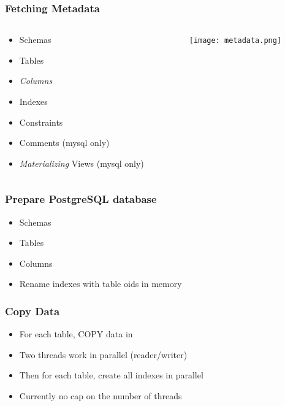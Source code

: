 \documentclass{beamer}
\begin{document}
\begin{frame}
  \frametitle{Fetching Metadata}

  \vfill

  \begin{columns}
    \begin{column}{0.5\textwidth}
      \begin{itemize}
      \item Schemas
      \item Tables
      \item \textit{Columns}
      \item Indexes
      \item Constraints
      \item Comments (mysql only)
      \item \textit{Materializing} Views (mysql only)
      \end{itemize}
    \end{column}

    \begin{column}{.5\textwidth}
      \begin{center}
        \texttt{[image: metadata.png]}
      \end{center}
    \end{column}
  \end{columns}
\end{frame}

\begin{frame}
  \frametitle{Prepare PostgreSQL database}

  \vfill

  \begin{itemize}
  \item Schemas
  \item Tables
  \item Columns
  \item Rename indexes with table oids in memory
  \end{itemize}
\end{frame}

\begin{frame}
  \frametitle{Copy Data}

  \vfill

  \begin{itemize}
  \item For each table, COPY data in
  \item Two threads work in parallel (reader/writer)
  \item Then for each table, create all indexes in parallel
  \item Currently no cap on the number of threads
  \end{itemize}
\end{frame}
\end{document}
